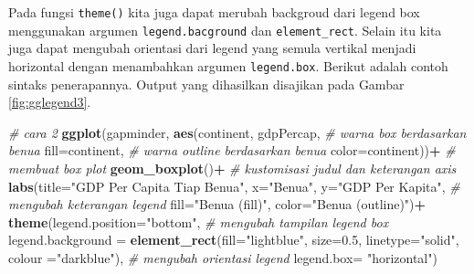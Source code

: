\documentclass[]{book}
\newenvironment{Shaded}{\begin{snugshade}}{\end{snugshade}}
\newcommand{\KeywordTok}[1]{\textcolor[rgb]{0.13,0.29,0.53}{\textbf{#1}}}
\newcommand{\DataTypeTok}[1]{\textcolor[rgb]{0.13,0.29,0.53}{#1}}
\newcommand{\FloatTok}[1]{\textcolor[rgb]{0.00,0.00,0.81}{#1}}
\newcommand{\StringTok}[1]{\textcolor[rgb]{0.31,0.60,0.02}{#1}}
\newcommand{\CommentTok}[1]{\textcolor[rgb]{0.56,0.35,0.01}{\textit{#1}}}
\newcommand{\OperatorTok}[1]{\textcolor[rgb]{0.81,0.36,0.00}{\textbf{#1}}}
\newcommand{\NormalTok}[1]{#1}
\begin{document}
Pada fungsi \texttt{theme()} kita juga dapat merubah backgroud dari
legend box menggunakan argumen \texttt{legend.bacground} dan
\texttt{element\_rect}. Selain itu kita juga dapat mengubah orientasi
dari legend yang semula vertikal menjadi horizontal dengan menambahkan
argumen \texttt{legend.box}. Berikut adalah contoh sintaks penerapannya.
Output yang dihasilkan disajikan pada Gambar \ref{fig:gglegend3}.

\begin{Shaded}
\begin{Highlighting}[]
\CommentTok{# cara 2}
\KeywordTok{ggplot}\NormalTok{(gapminder, }\KeywordTok{aes}\NormalTok{(continent, gdpPercap, }
                      \CommentTok{# warna box berdasarkan benua}
                      \DataTypeTok{fill=}\NormalTok{continent,}
                      \CommentTok{# warna outline berdasarkan benua}
                      \DataTypeTok{color=}\NormalTok{continent))}\OperatorTok{+}
\StringTok{  }\CommentTok{# membuat box plot}
\StringTok{  }\KeywordTok{geom_boxplot}\NormalTok{()}\OperatorTok{+}
\StringTok{  }\CommentTok{# kustomisasi judul dan keterangan axis}
\StringTok{  }\KeywordTok{labs}\NormalTok{(}\DataTypeTok{title=}\StringTok{"GDP Per Capita Tiap Benua"}\NormalTok{,}
       \DataTypeTok{x=}\StringTok{"Benua"}\NormalTok{, }\DataTypeTok{y=}\StringTok{"GDP Per Kapita"}\NormalTok{,}
       \CommentTok{# mengubah keterangan legend}
       \DataTypeTok{fill=}\StringTok{"Benua (fill)"}\NormalTok{,}
       \DataTypeTok{color=}\StringTok{"Benua (outline)"}\NormalTok{)}\OperatorTok{+}
\StringTok{  }\KeywordTok{theme}\NormalTok{(}\DataTypeTok{legend.position=}\StringTok{"bottom"}\NormalTok{,}
        \CommentTok{# mengubah tampilan legend box }
        \DataTypeTok{legend.background =} \KeywordTok{element_rect}\NormalTok{(}\DataTypeTok{fill=}\StringTok{"lightblue"}\NormalTok{,}
                                  \DataTypeTok{size=}\FloatTok{0.5}\NormalTok{, }\DataTypeTok{linetype=}\StringTok{"solid"}\NormalTok{, }
                                  \DataTypeTok{colour =}\StringTok{"darkblue"}\NormalTok{),}
        \CommentTok{# mengubah orientasi legend}
        \DataTypeTok{legend.box=} \StringTok{"horizontal"}\NormalTok{)}
\end{Highlighting}
\end{Shaded}
\end{document}
